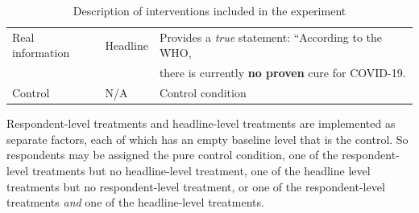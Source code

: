 \documentclass[letterpaper, 12pt, parskip=full,]{scrartcl}
\begin{document}
\begin{table}[H]
\begin{tabular}{l|l|l}
 \\
 Real information                                                                                                      & Headline                                                                                                     & Provides a \textit{true} statement: ``According to the WHO,\\ & & there is currently \textbf{no proven} cure for COVID-19.
 \\
Control                                                                                                        & N/A                                                                                                          & Control condition                                                                                                                                                                                                                                                                                                                                                                                              
\end{tabular}
\caption{Description of interventions included in the experiment}
\label{tab:treatments}
\end{table}

Respondent-level treatments and headline-level treatments are implemented as separate factors, each of which has an empty baseline level that is the control. So respondents may be assigned the pure control condition, one of the respondent-level treatments but no headline-level treatment, one of the headline level treatments but no respondent-level treatment, or one of the respondent-level treatments \textit{and} one of the headline-level treatments. 


\end{document}

